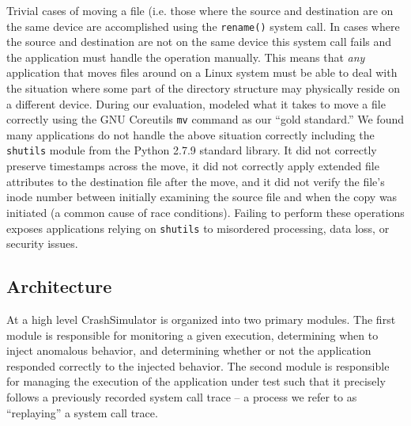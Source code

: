     Trivial cases of moving a file (i.e. those where the source and destination
    are on the same device are accomplished using the {\tt rename()} system
    call.  In cases where the source and destination are not on the same device
    this system call fails and the application must handle the operation
    manually. This means that \emph{any} application that moves files around on
    a Linux system must be able to deal with the situation where some part of
    the directory structure may physically reside on a different device.
    During our evaluation, modeled what
    it takes to move a file correctly using the GNU Coreutils {\tt mv} command
    as our ``gold standard.''  We found many applications do not handle the
    above situation correctly including the {\tt shutils} module from the Python
    2.7.9 standard library.  It did not correctly preserve timestamps across the
    move, it did not correctly apply extended file attributes to the destination
    file after the move, and it did not verify the file's inode number between
    initially examining the source file and when the copy was initiated (a
    common cause of race conditions).  Failing to perform these operations
    exposes applications relying on {\tt shutils} to misordered processing, data
    loss, or security issues.


    \subsection{Architecture}
        
    At a high level CrashSimulator is organized into two primary modules. The
    first module is responsible for monitoring a given execution, determining
    when to inject anomalous behavior, and determining whether or not the
    application responded correctly to the injected behavior. The second module
    is responsible for managing the execution of the application under test such
    that it precisely follows a previously recorded system call trace -- a
    process we refer to as ``replaying'' a system call trace.

